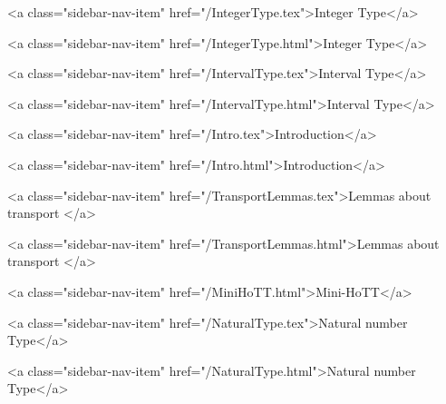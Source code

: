       
    
      
        
          <a class="sidebar-nav-item" href="/IntegerType.tex">Integer Type</a>
        
      
    
      
        
          <a class="sidebar-nav-item" href="/IntegerType.html">Integer Type</a>
        
      
    
      
        
          <a class="sidebar-nav-item" href="/IntervalType.tex">Interval Type</a>
        
      
    
      
        
          <a class="sidebar-nav-item" href="/IntervalType.html">Interval Type</a>
        
      
    
      
        
          <a class="sidebar-nav-item" href="/Intro.tex">Introduction</a>
        
      
    
      
        
          <a class="sidebar-nav-item" href="/Intro.html">Introduction</a>
        
      
    
      
        
          <a class="sidebar-nav-item" href="/TransportLemmas.tex">Lemmas about transport </a>
        
      
    
      
        
          <a class="sidebar-nav-item" href="/TransportLemmas.html">Lemmas about transport </a>
        
      
    
      
        
          <a class="sidebar-nav-item" href="/MiniHoTT.html">Mini-HoTT</a>
        
      
    
      
        
          <a class="sidebar-nav-item" href="/NaturalType.tex">Natural number Type</a>
        
      
    
      
        
          <a class="sidebar-nav-item" href="/NaturalType.html">Natural number Type</a>
        
